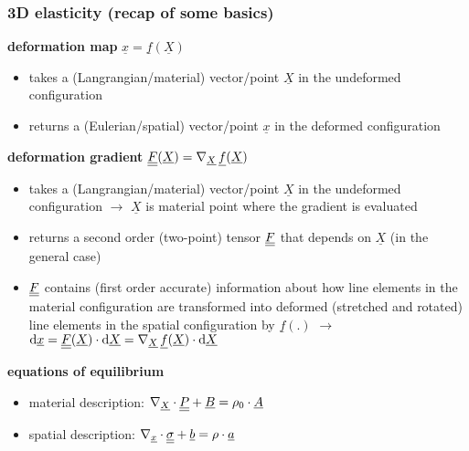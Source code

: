 \begin{frame}
  \frametitle{3D elasticity (recap of some basics)}
  
  \textbf{deformation map} $\underline{x} = \underline{f}(\underline{X})$
  \begin{itemize}
    \item takes a (Langrangian/material) vector/point $\underline{X}$ in the undeformed configuration
    \item returns a (Eulerian/spatial) vector/point $\underline{x}$ in the deformed configuration
  \end{itemize}
  \vspace{1em}
  
  \textbf{deformation gradient} $\underline{\underline{F}}(\underline{X}) = \nabla_{\underline{X}} \,\underline{f}(\underline{X})$
  \begin{itemize}
    \item takes a (Langrangian/material) vector/point $\underline{X}$ in the undeformed configuration \newline
      $\rightarrow$ $\underline{X}$ is material point where the gradient is evaluated
    \item returns a second order (two-point) tensor $\underline{\underline{F}}$ that depends on $\underline{X}$ (in the general case)
    \item $\underline{\underline{F}}$ contains (first order accurate) information about how line elements in the material configuration are transformed into deformed (stretched and rotated) line elements in the spatial configuration by $\underline{f}(.)$ \newline
      $\rightarrow$ $\dif \underline{x} = \doubleunderline{F}(\underline{X}) \cdot \dif \underline{X}= \nabla_{\underline{X}} \,\underline{f}(\underline{X}) \cdot \dif \underline{X}$
  \end{itemize}
  \vspace{1em}
  
  \textbf{equations of equilibrium}
  \begin{itemize}
    \item material description: $\nabla_{\underline{X}} \cdot \underline{\underline{P}} + \underline{B} = \rho_0 \cdot \underline{A}$
    \item spatial description: $\nabla_{\underline{x}} \cdot \underline{\underline{\sigma}} + \underline{b} = \rho \cdot \underline{a}$
  \end{itemize}
\end{frame}


